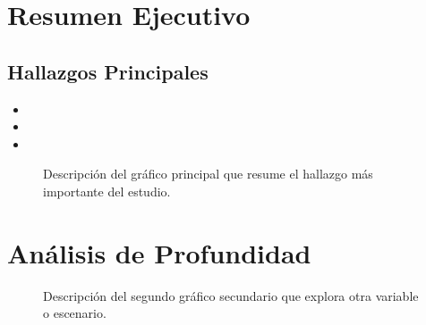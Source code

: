 \documentclass[11pt, a4paper]{article}
\begin{document}
\makeWCTitlePage

\tableofcontents
\clearpage


\section*{Resumen Ejecutivo}
\lipsum[1] %

\subsection*{Hallazgos Principales}
\begin{itemize}
    \item \lipsum[2][1-2] %
    \item \lipsum[3][1-2]
    \item \lipsum[4][1-2]
\end{itemize}

\begin{figure}[h!]
    \centering
    \caption{Descripción del gráfico principal que resume el hallazgo más importante del estudio.}
\end{figure}

\clearpage

\section*{Análisis de Profundidad}
\lipsum[5]

\begin{figure}[h!]
    \centering
    \begin{minipage}[t]{0.48\textwidth}
        \caption{Descripción del primer gráfico secundario que profundiza en un aspecto del análisis.}
    \end{minipage}
    \hfill
    \begin{minipage}[t]{0.48\textwidth}
        \caption{Descripción del segundo gráfico secundario que explora otra variable o escenario.}
    \end{minipage}
\end{figure}
\end{document}
